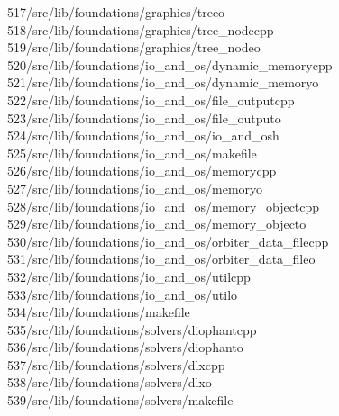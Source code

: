 \begin{tabbing}
517\>/src/lib/foundations/graphics/treeo\\[0pt]
518\>/src/lib/foundations/graphics/tree\_nodecpp\\[0pt]
519\>/src/lib/foundations/graphics/tree\_nodeo\\[0pt]
520\>/src/lib/foundations/io\_and\_os/dynamic\_memorycpp\\[0pt]
521\>/src/lib/foundations/io\_and\_os/dynamic\_memoryo\\[0pt]
522\>/src/lib/foundations/io\_and\_os/file\_outputcpp\\[0pt]
523\>/src/lib/foundations/io\_and\_os/file\_outputo\\[0pt]
524\>/src/lib/foundations/io\_and\_os/io\_and\_osh\\[0pt]
525\>/src/lib/foundations/io\_and\_os/makefile\\[0pt]
526\>/src/lib/foundations/io\_and\_os/memorycpp\\[0pt]
527\>/src/lib/foundations/io\_and\_os/memoryo\\[0pt]
528\>/src/lib/foundations/io\_and\_os/memory\_objectcpp\\[0pt]
529\>/src/lib/foundations/io\_and\_os/memory\_objecto\\[0pt]
530\>/src/lib/foundations/io\_and\_os/orbiter\_data\_filecpp\\[0pt]
531\>/src/lib/foundations/io\_and\_os/orbiter\_data\_fileo\\[0pt]
532\>/src/lib/foundations/io\_and\_os/utilcpp\\[0pt]
533\>/src/lib/foundations/io\_and\_os/utilo\\[0pt]
534\>/src/lib/foundations/makefile\\[0pt]
535\>/src/lib/foundations/solvers/diophantcpp\\[0pt]
536\>/src/lib/foundations/solvers/diophanto\\[0pt]
537\>/src/lib/foundations/solvers/dlxcpp\\[0pt]
538\>/src/lib/foundations/solvers/dlxo\\[0pt]
539\>/src/lib/foundations/solvers/makefile\\[0pt]

\end{tabbing}
